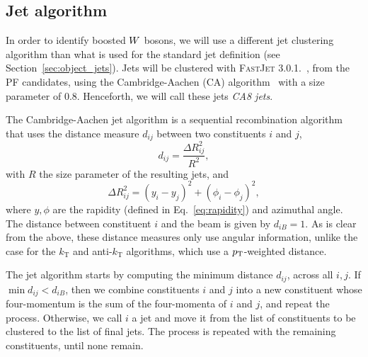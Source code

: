 \subsection{Jet algorithm}

In order to identify boosted $W$ bosons,  we will use a different jet clustering algorithm
than what is used for the standard jet definition (see Section~\ref{sec:object_jets}). 
Jets will be clustered with \textsc{FastJet 3.0.1.}~\cite{Cacciari:2011ma}, from the PF candidates,
using the Cambridge-Aachen (CA) algorithm~\cite{Dokshitzer:1997in} with a size parameter of 0.8.
Henceforth, we will call these jets \textit{CA8 jets}. 

\begin{cajet} \theoremstyle{definition}
The Cambridge-Aachen jet algorithm is a sequential recombination algorithm that uses the
distance measure $d_{ij}$ between two constituents $i$ and $j$,
\begin{equation}
d_{ij} = \frac{\Delta R_{ij}^2}{R^2}, \label{eq:CA_distance}
\end{equation}
with $R$ the size parameter of the resulting jets, and
\begin{equation}
\Delta R_{ij}^2 = (y_i - y_j)^2 + (\phi_i - \phi_j)^2 ,
\label{eq:DeltaR_jet_algo}
\end{equation}
where $y, \phi$ are the rapidity (defined in Eq.~\ref{eq:rapidity}) and azimuthal angle. 
The distance between constituent $i$ and the beam is given by $d_{iB} = 1$.
As is clear from the above, these distance measures only use angular information, unlike the case
for the $k_\mathrm{T}$ and anti-$k_\mathrm{T}$ algorithms, which use a $p_{\mathrm{T}}$-weighted distance. 

The jet algorithm starts by computing the minimum distance $d_{ij}$, across all $i,j$. If $\min
d_{ij} < d_{iB}$, then we combine constituents $i$ and $j$ into a new constituent whose
four-momentum is the sum of the four-momenta of $i$ and $j$, and repeat the process. Otherwise, we
call $i$ a jet and move it from the list of constituents to be clustered to the list of final jets.
The process is repeated with the remaining constituents, until none remain.
\end{cajet}


